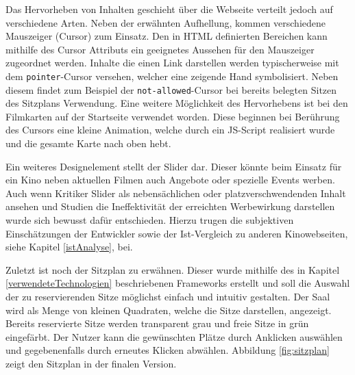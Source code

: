 	
	Das Hervorheben von Inhalten geschieht über die Webseite verteilt jedoch auf verschiedene Arten. Neben der erwähnten Aufhellung, kommen verschiedene Mauszeiger (Cursor) zum Einsatz. Den in \ac{HTML} definierten Bereichen kann mithilfe des Cursor Attributs ein geeignetes Aussehen für den Mauszeiger zugeordnet werden. Inhalte die einen Link darstellen werden typischerweise mit dem \texttt{pointer}-Cursor versehen, welcher eine zeigende Hand symbolisiert. Neben diesem findet zum Beispiel der \texttt{not-allowed}-Cursor bei bereits belegten Sitzen des Sitzplans Verwendung. Eine weitere Möglichkeit des Hervorhebens ist bei den Filmkarten auf der Startseite verwendet worden. Diese beginnen bei Berührung des Cursors eine kleine Animation, welche durch ein JS-Script realisiert wurde und die gesamte Karte nach oben hebt. 
	
	Ein weiteres Designelement stellt der Slider dar. Dieser könnte beim Einsatz für ein Kino neben aktuellen Filmen auch Angebote oder spezielle Events werben. Auch wenn Kritiker Slider als nebensächlichen oder platzverschwendenden Inhalt ansehen und Studien die Ineffektivität der erreichten Werbewirkung darstellen\autocite[Vgl.][]{Webdesign} wurde sich bewusst dafür entschieden. Hierzu trugen die subjektiven Einschätzungen der Entwickler sowie der Ist-Vergleich zu anderen Kinowebseiten, siehe Kapitel \vref{istAnalyse}, bei.
	
	Zuletzt ist noch der Sitzplan zu erwähnen. Dieser wurde mithilfe des in Kapitel \vref{verwendeteTechnologien}
	beschriebenen Frameworks erstellt und soll die Auswahl der zu reservierenden Sitze möglichst einfach und intuitiv gestalten. Der Saal wird als Menge von kleinen Quadraten, welche die Sitze darstellen, angezeigt. Bereits reservierte Sitze werden transparent grau und freie Sitze in grün eingefärbt. Der Nutzer kann die gewünschten Plätze durch Anklicken auswählen und gegebenenfalls durch erneutes Klicken abwählen. Abbildung \vref{fig:sitzplan} zeigt den Sitzplan in der finalen Version.
	
